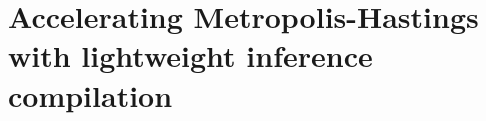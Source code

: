 \documentclass[../../thesis.tex]{subfiles}
\begin{document}
%

%





\chapter{Accelerating Metropolis-Hastings with lightweight inference compilation}
\label{ch:lic}
\end{document}
